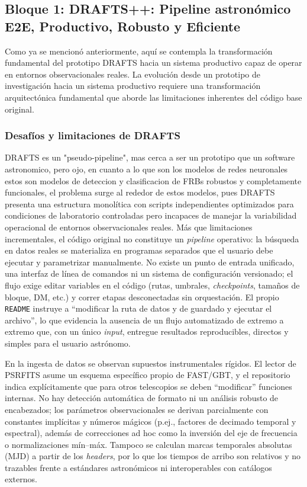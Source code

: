 \subsection{Bloque 1: DRAFTS++: Pipeline astronómico E2E, Productivo, Robusto y Eficiente}

Como ya se mencionó anteriormente, aquí se contempla la transformación fundamental del prototipo DRAFTS hacia un sistema productivo capaz de operar en entornos observacionales reales. La evolución desde un prototipo de investigación hacia un sistema productivo requiere una transformación arquitectónica fundamental que aborde las limitaciones inherentes del código base original.

\subsubsection{Desafíos y limitaciones de DRAFTS}

DRAFTS es un "pseudo-pipeline", mas cerca a ser un prototipo que un software astronomico, pero ojo, en cuanto a lo que son los modelos de redes neuronales estos son modelos de deteccion y clasificacion de FRBs robustos y completamente funcionales, el problema surge al rededor de estos modelos, pues DRAFTS presenta una estructura monolítica con scripts independientes optimizados para condiciones de laboratorio controladas pero incapaces de manejar la variabilidad operacional de entornos observacionales reales. Más que limitaciones incrementales, el código original no constituye un \emph{pipeline} operativo: la búsqueda en datos reales se materializa en programas separados que el usuario debe ejecutar y parametrizar manualmente. No existe un punto de entrada unificado, una interfaz de línea de comandos ni un sistema de configuración versionado; el flujo exige editar variables en el código (rutas, umbrales, \textit{checkpoints}, tamaños de bloque, DM, etc.) y correr etapas desconectadas sin orquestación. El propio \texttt{README} instruye a “modificar la ruta de datos y de guardado y ejecutar el archivo”, lo que evidencia la ausencia de un flujo automatizado de extremo a extremo que, con un único \emph{input}, entregue resultados reproducibles, directos y simples para el usuario astrónomo.

En la ingesta de datos se observan supuestos instrumentales rígidos. El lector de PSRFITS asume un esquema específico propio de FAST/GBT, y el repositorio indica explícitamente que para otros telescopios se deben “modificar” funciones internas. No hay detección automática de formato ni un análisis robusto de encabezados; los parámetros observacionales se derivan parcialmente con constantes implícitas y números mágicos (p.ej., factores de decimado temporal y espectral), además de correcciones ad hoc como la inversión del eje de frecuencia o normalizaciones mín--máx. Tampoco se calculan marcas temporales absolutas (MJD) a partir de los \emph{headers}, por lo que los tiempos de arribo son relativos y no trazables frente a estándares astronómicos ni interoperables con catálogos externos.

